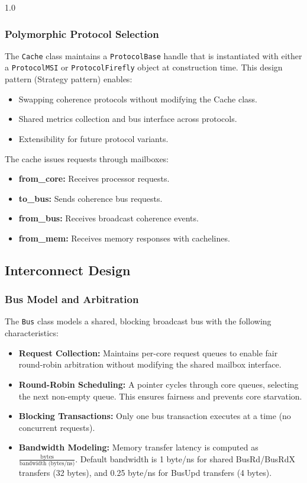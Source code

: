 \documentclass[12pt]{article}
\begin{document}
\begin{spacing}{1.0}
\subsubsection{Polymorphic Protocol Selection}

The \texttt{Cache} class maintains a \texttt{ProtocolBase} handle that is instantiated with either a \texttt{ProtocolMSI} or \texttt{ProtocolFirefly} object at construction time. This design pattern (Strategy pattern) enables:

\begin{itemize}
    \item Swapping coherence protocols without modifying the Cache class.
    \item Shared metrics collection and bus interface across protocols.
    \item Extensibility for future protocol variants.
\end{itemize}

The cache issues requests through mailboxes:

\begin{itemize}
    \item \textbf{from\_core:} Receives processor requests.
    \item \textbf{to\_bus:} Sends coherence bus requests.
    \item \textbf{from\_bus:} Receives broadcast coherence events.
    \item \textbf{from\_mem:} Receives memory responses with cachelines.
\end{itemize}

\subsection{Interconnect Design}

\subsubsection{Bus Model and Arbitration}

The \texttt{Bus} class models a shared, blocking broadcast bus with the following characteristics:

\begin{itemize}
    \item \textbf{Request Collection:} Maintains per-core request queues to enable fair round-robin arbitration without modifying the shared mailbox interface.
    \item \textbf{Round-Robin Scheduling:} A pointer cycles through core queues, selecting the next non-empty queue. This ensures fairness and prevents core starvation.
    \item \textbf{Blocking Transactions:} Only one bus transaction executes at a time (no concurrent requests).
    \item \textbf{Bandwidth Modeling:} Memory transfer latency is computed as $\frac{\text{bytes}}{\text{bandwidth (bytes/ns)}}$. Default bandwidth is 1 byte/ns for shared BusRd/BusRdX transfers (32 bytes), and 0.25 byte/ns for BusUpd transfers (4 bytes).
\end{itemize}


\end{spacing}
\end{document}
